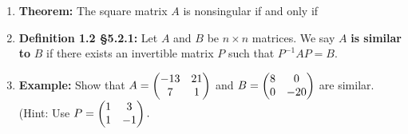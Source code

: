 \documentclass[11pt,fleqn]{article}
\begin{document}
\begin{enumerate}
\vspace{1in}


\item \textbf{Theorem:} The square matrix $A$ is nonsingular if and only if 

\vspace{.5in}

\item \textbf{Definition 1.2 \S 5.2.1:} Let $A$ and $B$ be $n \times n$ matrices. We say $A$ \textbf{is similar to} $B$ if there exists an invertible matrix $P$ such that $P^{-1}AP=B.$

\item \textbf{Example:} Show that $A=\begin{pmatrix} -13&21\\7&1\end{pmatrix}$ and $B=\begin{pmatrix} 8&0\\0&-20\end{pmatrix}$ are similar. (Hint: Use $P=\begin{pmatrix} 1&3\\1&-1\end{pmatrix}.$

\vfill

 
   \end{enumerate}
  
\end{document}

